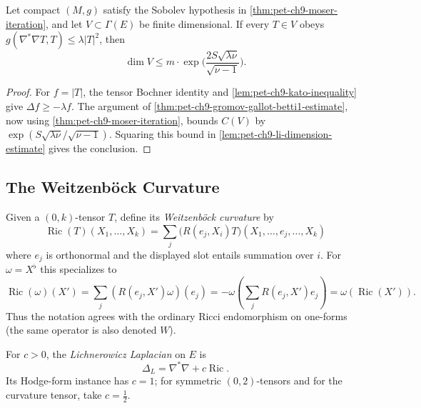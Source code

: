 \begin{theorem}
  \label{thm:pet-ch9-gallot-connection-laplacian-estimate}
  Let compact $(M,g)$ satisfy the Sobolev hypothesis in
  \cref{thm:pet-ch9-moser-iteration}, and let $V\subset\Gamma(E)$ be finite
  dimensional.  If every $T\in V$ obeys
  $g(\nabla^*\nabla T,T)\le\lambda|T|^2$, then
  \[
    \dim V\le
    m\cdot\exp\Big(\frac{2S\sqrt{\lambda\nu}}{\sqrt{\nu-1}}\Big).
  \]
\end{theorem}
\begin{proof}
  \sketch
  For \(f=|T|\), the tensor Bochner identity and
  \cref{lem:pet-ch9-kato-inequality} give \(\Delta f\ge-\lambda f\).
  The argument of \cref{thm:pet-ch9-gromov-gallot-betti1-estimate}, now using
  \cref{thm:pet-ch9-moser-iteration}, bounds
  \(C(V)\) by
  \(\exp(S\sqrt{\lambda\nu}/\sqrt{\nu-1})\). Squaring this bound in
  \cref{lem:pet-ch9-li-dimension-estimate} gives the conclusion.
\end{proof}

\subsection{The Weitzenböck Curvature}

\begin{definition}
  \label{def:pet-ch9-weitzenbock-curvature-operator}
  Given a $(0,k)$-tensor $T$, define its \emph{Weitzenb\"ock curvature} by
  \[
    \operatorname{Ric}(T)(X_1,\dots,X_k)=\sum_j\big(R(e_j,X_i)T\big)(X_1,\dots,e_j,\dots,X_k)
  \]
  where $e_j$ is orthonormal and the displayed slot entails summation over
  $i$.  For $\omega=X^\flat$ this specializes to
  \[
    \operatorname{Ric}(\omega)(X')
      =\sum_j(R(e_j,X')\omega)(e_j)
      =-\omega\left(\sum_jR(e_j,X')e_j\right)
      =\omega(\operatorname{Ric}(X')).
  \]
  Thus the notation agrees with the ordinary Ricci endomorphism on one-forms
  (the same operator is also denoted $W$).
\end{definition}

\begin{definition}
  \label{def:pet-ch9-lichnerowicz-laplacian}
  For $c>0$, the \emph{Lichnerowicz Laplacian} on $E$ is
  \[
    \Delta_L=\nabla^*\nabla+c\operatorname{Ric}.
  \]
  Its Hodge-form instance has $c=1$; for symmetric $(0,2)$-tensors and for
  the curvature tensor, take $c=\tfrac12$.
\end{definition}

